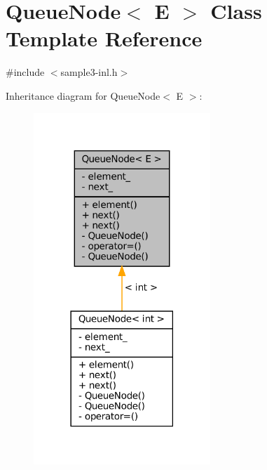 \hypertarget{classQueueNode}{}\section{Queue\+Node$<$ E $>$ Class Template Reference}
\label{classQueueNode}


{\ttfamily \#include $<$sample3-\/inl.\+h$>$}



Inheritance diagram for Queue\+Node$<$ E $>$\+:
\nopagebreak
\begin{figure}[H]
\begin{center}
\leavevmode
\includegraphics[width=189pt]{classQueueNode__inherit__graph}
\end{center}
\end{figure}



